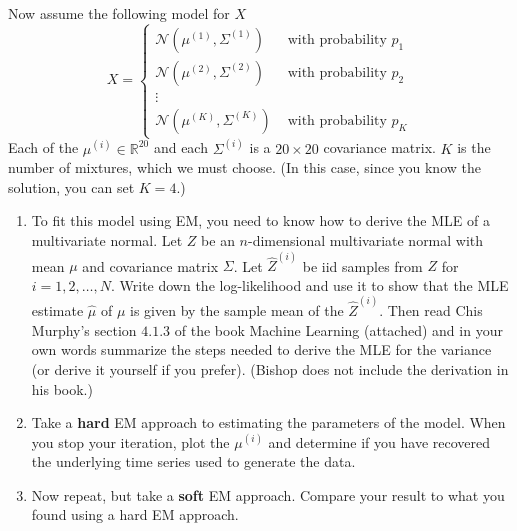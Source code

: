 \documentclass{article}
\begin{document}
\begin{enumerate}
Now assume the following model for $X$
\begin{equation}
X = \left\{
\begin{array}{cc}
\mathcal{N}(\mu^{(1)}, \Sigma^{(1)}) & \text{ with probability } p_1 \\
\mathcal{N}(\mu^{(2)}, \Sigma^{(2)}) & \text{ with probability } p_2\\
\vdots & \\
\mathcal{N}(\mu^{(K)}, \Sigma^{(K)}) & \text{ with probability } p_K
\end{array}
\right.
\end{equation}
Each of the $\mu^{(i)} \in \mathbb{R}^{20}$ and each $\Sigma^{(i)}$ is a $20 \times 20$ covariance matrix.  $K$ is the number of mixtures, which we must choose. (In this case, since you know the solution, you can set $K=4$.)
\begin{enumerate}
\item To fit this model using EM, you need to know how to derive the MLE of a multivariate normal.  Let $Z$ be an $n$-dimensional multivariate normal with mean $\mu$ and covariance matrix $\Sigma$.  Let $\hat{Z}^{(i)}$ be iid samples from $Z$ for $i=1,2,\dots,N$.   Write down the log-likelihood and use it to show that  the MLE estimate $\hat{\mu}$ of $\mu$ is given by the sample mean of the $\hat{Z}^{(i)}$.   Then read Chis Murphy's section $4.1.3$ of the book Machine Learning (attached) and in your own words summarize the steps needed to derive the MLE for the variance (or derive it yourself if you prefer).  (Bishop does not include the derivation in his book.)
\item Take a \textbf{hard} EM approach to estimating the parameters of the model.   When you stop your iteration, plot the $\mu^{(i)}$ and determine if you have recovered the underlying time series used to generate the data.  
\item Now repeat, but take a \textbf{soft} EM approach.  Compare your result to what you found using a hard EM approach.
\end{enumerate}



\end{enumerate}
\end{document}
